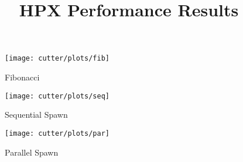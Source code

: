 \documentclass[10pt]{article}
\title{HPX Performance Results}
\author{}
\begin{document}
\maketitle

\begin{figure}[!ht]
\centering
\texttt{[image: cutter/plots/fib]}
\caption{Fibonacci}
\label{fig:fib}
\end{figure}

\begin{figure}[!ht]
\centering
\texttt{[image: cutter/plots/seq]}
\caption{Sequential Spawn}
\label{fig:seq}
\end{figure}

\begin{figure}[!ht]
\centering
\texttt{[image: cutter/plots/par]}
\caption{Parallel Spawn}
\label{fig:par}
\end{figure}
\end{document}

